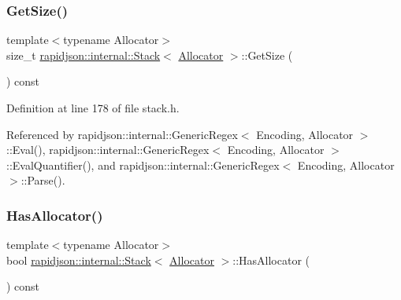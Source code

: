 \subsubsection{\texorpdfstring{GetSize()}{GetSize()}}
{\footnotesize\ttfamily template$<$typename Allocator$>$ \\
size\+\_\+t \mbox{\hyperlink{classrapidjson_1_1internal_1_1_stack}{rapidjson\+::internal\+::\+Stack}}$<$ \mbox{\hyperlink{classrapidjson_1_1_allocator}{Allocator}} $>$\+::Get\+Size (\begin{DoxyParamCaption}{ }\end{DoxyParamCaption}) const}



Definition at line 178 of file stack.\+h.


\begin{DoxyCode}{0}

\end{DoxyCode}


Referenced by rapidjson\+::internal\+::\+Generic\+Regex$<$ Encoding, Allocator $>$\+::\+Eval(), rapidjson\+::internal\+::\+Generic\+Regex$<$ Encoding, Allocator $>$\+::\+Eval\+Quantifier(), and rapidjson\+::internal\+::\+Generic\+Regex$<$ Encoding, Allocator $>$\+::\+Parse().

\mbox{\label{classrapidjson_1_1internal_1_1_stack_a2167273a8e50c7d7fc9749d8f246c12c}} 
\subsubsection{\texorpdfstring{HasAllocator()}{HasAllocator()}}
{\footnotesize\ttfamily template$<$typename Allocator$>$ \\
bool \mbox{\hyperlink{classrapidjson_1_1internal_1_1_stack}{rapidjson\+::internal\+::\+Stack}}$<$ \mbox{\hyperlink{classrapidjson_1_1_allocator}{Allocator}} $>$\+::Has\+Allocator (\begin{DoxyParamCaption}{ }\end{DoxyParamCaption}) const}



